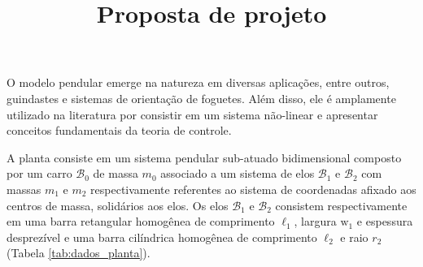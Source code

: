 \documentclass[a4paper, twoside]{article}
\title{Proposta de projeto}
\author{\studentname \qquad \uspid \qquad \uspmail}
\begin{document}
    
    \maketitle
    \thispagestyle{fancy}

    O modelo pendular emerge na natureza em diversas aplicações, entre outros, guindastes e sistemas de orientação de foguetes. Além disso, ele é amplamente utilizado na literatura por consistir em um sistema não-linear e apresentar conceitos fundamentais da teoria de controle. 
    
    A planta consiste em um sistema pendular sub-atuado bidimensional composto por um carro $\mathcal{B}_0$ de massa $m_0$ associado a um sistema de elos $\mathcal{B}_1$ e $\mathcal{B}_2$ com massas $m_1$ e $m_2$ respectivamente referentes ao sistema de coordenadas afixado aos centros de massa, solidários aos elos. Os elos $\mathcal{B}_1$ e $\mathcal{B}_2$ consistem respectivamente em uma barra retangular homogênea de comprimento $\ell_1$, largura $\mathrm{w}_1$ e espessura desprezível e uma barra cilíndrica homogênea de comprimento $\ell_2$ e raio $r_2$ (Tabela \ref{tab:dados_planta}).
    
\end{document}
